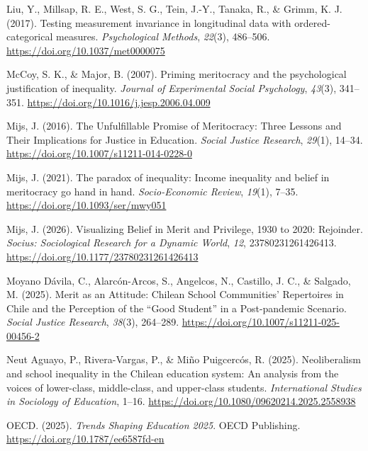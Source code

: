 \documentclass[
  13pt,
]{article}
\newlength{\cslhangindent}
\newenvironment{CSLReferences}[2] %
 {\begin{list}{}{%
  \setlength{\itemindent}{0pt}
  \setlength{\leftmargin}{0pt}
  \setlength{\parsep}{0pt}
  \ifodd #1
   \setlength{\leftmargin}{\cslhangindent}
   \setlength{\itemindent}{-1\cslhangindent}
  \fi
  \setlength{\itemsep}{#2\baselineskip}}}
 {\end{list}}
\begin{document}
\begin{CSLReferences}{1}{0}
Liu, Y., Millsap, R. E., West, S. G., Tein, J.-Y., Tanaka, R., \& Grimm,
K. J. (2017). Testing measurement invariance in longitudinal data with
ordered-categorical measures. \emph{Psychological Methods},
\emph{22}(3), 486--506. \url{https://doi.org/10.1037/met0000075}

McCoy, S. K., \& Major, B. (2007). Priming meritocracy and the
psychological justification of inequality. \emph{Journal of Experimental
Social Psychology}, \emph{43}(3), 341--351.
\url{https://doi.org/10.1016/j.jesp.2006.04.009}

Mijs, J. (2016). The {Unfulfillable Promise} of {Meritocracy}: {Three
Lessons} and {Their Implications} for {Justice} in {Education}.
\emph{Social Justice Research}, \emph{29}(1), 14--34.
\url{https://doi.org/10.1007/s11211-014-0228-0}

Mijs, J. (2021). The paradox of inequality: Income inequality and belief
in meritocracy go hand in hand. \emph{Socio-Economic Review},
\emph{19}(1), 7--35. \url{https://doi.org/10.1093/ser/mwy051}

Mijs, J. (2026). Visualizing {Belief} in {Merit} and {Privilege}, 1930
to 2020: {Rejoinder}. \emph{Socius: Sociological Research for a Dynamic
World}, \emph{12}, 23780231261426413.
\url{https://doi.org/10.1177/23780231261426413}

Moyano Dávila, C., Alarcón-Arcos, S., Angelcos, N., Castillo, J. C., \&
Salgado, M. (2025). Merit as an {Attitude}: {Chilean School
Communities}' {Repertoires} in {Chile} and the {Perception} of the
{``{Good Student}''} in a {Post-pandemic Scenario}. \emph{Social Justice
Research}, \emph{38}(3), 264--289.
\url{https://doi.org/10.1007/s11211-025-00456-2}

Neut Aguayo, P., Rivera-Vargas, P., \& Miño Puigcercós, R. (2025).
Neoliberalism and school inequality in the {Chilean} education system:
An analysis from the voices of lower-class, middle-class, and
upper-class students. \emph{International Studies in Sociology of
Education}, 1--16. \url{https://doi.org/10.1080/09620214.2025.2558938}

OECD. (2025). \emph{Trends {Shaping Education} 2025}. OECD Publishing.
\url{https://doi.org/10.1787/ee6587fd-en}


\end{CSLReferences}
\end{document}
